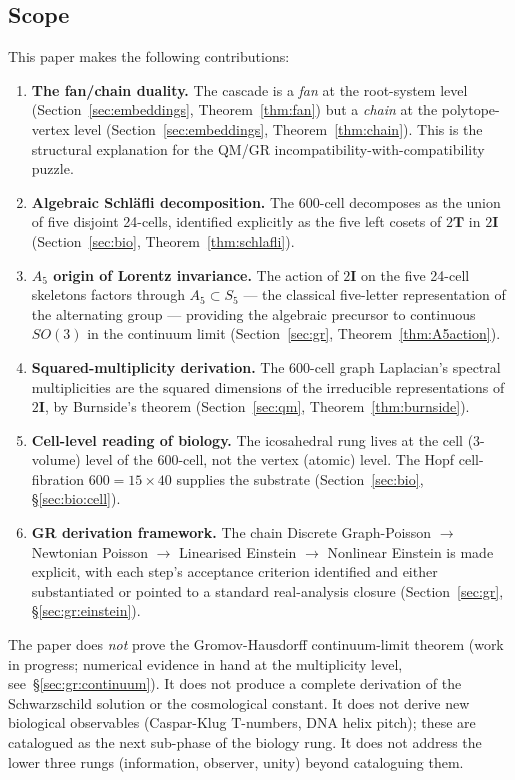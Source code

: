 \documentclass[12pt]{article}
\newcommand{\twoT}{2\mathbf{T}}
\newcommand{\twoI}{2\mathbf{I}}
\begin{document}
\subsection{Scope}

This paper makes the following contributions:
\begin{enumerate}
    \item \textbf{The fan/chain duality.} The cascade is a \emph{fan} at the root-system level (Section~\ref{sec:embeddings}, Theorem~\ref{thm:fan}) but a \emph{chain} at the polytope-vertex level (Section~\ref{sec:embeddings}, Theorem~\ref{thm:chain}). This is the structural explanation for the QM/GR incompatibility-with-compatibility puzzle.
    \item \textbf{Algebraic Schl\"afli decomposition.} The 600-cell decomposes as the union of five disjoint 24-cells, identified explicitly as the five left cosets of $\twoT$ in $\twoI$ (Section~\ref{sec:bio}, Theorem~\ref{thm:schlafli}).
    \item \textbf{$A_5$ origin of Lorentz invariance.} The action of $\twoI$ on the five 24-cell skeletons factors through $A_5 \subset S_5$ --- the classical five-letter representation of the alternating group --- providing the algebraic precursor to continuous $SO(3)$ in the continuum limit (Section~\ref{sec:gr}, Theorem~\ref{thm:A5action}).
    \item \textbf{Squared-multiplicity derivation.} The 600-cell graph Laplacian's spectral multiplicities are the squared dimensions of the irreducible representations of $\twoI$, by Burnside's theorem (Section~\ref{sec:qm}, Theorem~\ref{thm:burnside}).
    \item \textbf{Cell-level reading of biology.} The icosahedral rung lives at the cell (3-volume) level of the 600-cell, not the vertex (atomic) level. The Hopf cell-fibration $600 = 15 \times 40$ supplies the substrate (Section~\ref{sec:bio}, \S\ref{sec:bio:cell}).
    \item \textbf{GR derivation framework.} The chain Discrete Graph-Poisson $\to$ Newtonian Poisson $\to$ Linearised Einstein $\to$ Nonlinear Einstein is made explicit, with each step's acceptance criterion identified and either substantiated or pointed to a standard real-analysis closure (Section~\ref{sec:gr}, \S\ref{sec:gr:einstein}).
\end{enumerate}

\noindent The paper does \emph{not} prove the Gromov-Hausdorff continuum-limit theorem (work in progress; numerical evidence in hand at the multiplicity level, see~\S\ref{sec:gr:continuum}). It does not produce a complete derivation of the Schwarzschild solution or the cosmological constant. It does not derive new biological observables (Caspar-Klug T-numbers, DNA helix pitch); these are catalogued as the next sub-phase of the biology rung. It does not address the lower three rungs (information, observer, unity) beyond cataloguing them.
\end{document}
